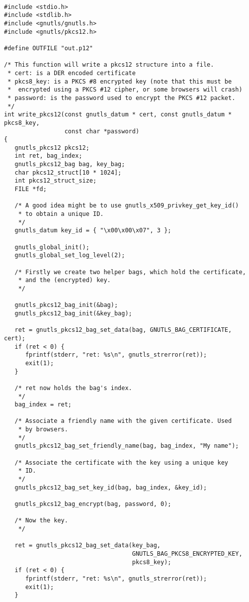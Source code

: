 \begin{verbatim}

#include <stdio.h>
#include <stdlib.h>
#include <gnutls/gnutls.h>
#include <gnutls/pkcs12.h>

#define OUTFILE "out.p12"

/* This function will write a pkcs12 structure into a file.
 * cert: is a DER encoded certificate
 * pkcs8_key: is a PKCS #8 encrypted key (note that this must be
 *  encrypted using a PKCS #12 cipher, or some browsers will crash)
 * password: is the password used to encrypt the PKCS #12 packet.
 */
int write_pkcs12(const gnutls_datum * cert, const gnutls_datum * pkcs8_key,
                 const char *password)
{
   gnutls_pkcs12 pkcs12;
   int ret, bag_index;
   gnutls_pkcs12_bag bag, key_bag;
   char pkcs12_struct[10 * 1024];
   int pkcs12_struct_size;
   FILE *fd;

   /* A good idea might be to use gnutls_x509_privkey_get_key_id()
    * to obtain a unique ID.
    */
   gnutls_datum key_id = { "\x00\x00\x07", 3 };

   gnutls_global_init();
   gnutls_global_set_log_level(2);

   /* Firstly we create two helper bags, which hold the certificate,
    * and the (encrypted) key.
    */

   gnutls_pkcs12_bag_init(&bag);
   gnutls_pkcs12_bag_init(&key_bag);

   ret = gnutls_pkcs12_bag_set_data(bag, GNUTLS_BAG_CERTIFICATE, cert);
   if (ret < 0) {
      fprintf(stderr, "ret: %s\n", gnutls_strerror(ret));
      exit(1);
   }

   /* ret now holds the bag's index.
    */
   bag_index = ret;

   /* Associate a friendly name with the given certificate. Used
    * by browsers.
    */
   gnutls_pkcs12_bag_set_friendly_name(bag, bag_index, "My name");

   /* Associate the certificate with the key using a unique key
    * ID.
    */
   gnutls_pkcs12_bag_set_key_id(bag, bag_index, &key_id);

   gnutls_pkcs12_bag_encrypt(bag, password, 0);

   /* Now the key.
    */

   ret = gnutls_pkcs12_bag_set_data(key_bag,
                                    GNUTLS_BAG_PKCS8_ENCRYPTED_KEY,
                                    pkcs8_key);
   if (ret < 0) {
      fprintf(stderr, "ret: %s\n", gnutls_strerror(ret));
      exit(1);
   }


\end{verbatim}
